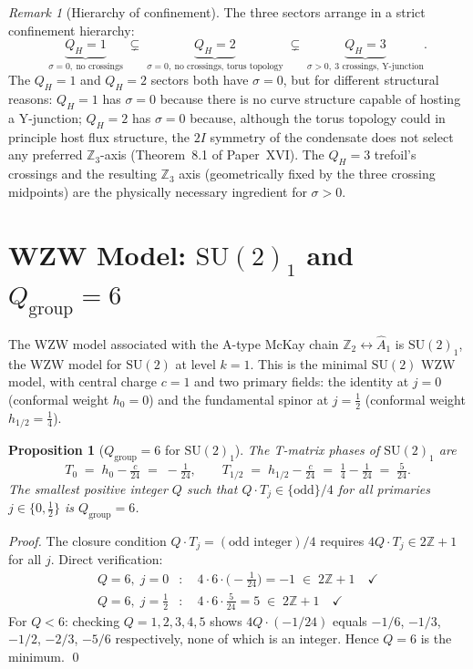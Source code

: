 \documentclass[11pt,a4paper]{article}
\newtheorem{proposition}[theorem]{Proposition}
\theoremstyle{definition}\newtheorem{definition}[theorem]{Definition}
\theoremstyle{remark}
\newtheorem{remark}[theorem]{Remark}
\newcommand{\SU}{\mathrm{SU}}
\newcommand{\twoI}{2I}
\newcommand{\QH}{Q_H}
\newcommand{\Ztwo}{\mathbb{Z}_2}
\newcommand{\Zthree}{\mathbb{Z}_3}
\begin{document}
\begin{remark}[Hierarchy of confinement]
\label{P17:rem:confinement_hierarchy}
The three sectors arrange in a strict confinement hierarchy:
\[
  \underbrace{\QH=1}_{\sigma=0,\ \text{no crossings}}
  \;\subsetneq\;
  \underbrace{\QH=2}_{\sigma=0,\ \text{no crossings, torus topology}}
  \;\subsetneq\;
  \underbrace{\QH=3}_{\sigma>0,\ \text{3 crossings, Y-junction}}.
\]
The $\QH=1$ and $\QH=2$ sectors both have $\sigma=0$, but for
different structural reasons: $\QH=1$ has $\sigma=0$ because there is
no curve structure capable of hosting a Y-junction; $\QH=2$ has
$\sigma=0$ because, although the torus topology could in principle host
flux structure, the $\twoI$ symmetry of the condensate does not select
any preferred $\Zthree$-axis (Theorem~8.1 %
of Paper~XVI). The $\QH=3$ trefoil's crossings and the resulting
$\Zthree$ axis (geometrically fixed by the three crossing midpoints)
are the physically necessary ingredient for $\sigma>0$.
\end{remark}

\section{WZW Model: $\SU(2)_1$ and $Q_{\mathrm{group}}=6$}
\label{P17:sec:wzw}

The WZW model associated with the A-type McKay chain
$\Ztwo\leftrightarrow\widehat{A}_1$ is $\SU(2)_1$, the WZW model for
$\SU(2)$ at level $k=1$. This is the minimal $\SU(2)$ WZW model,
with central charge $c=1$ and two primary fields: the identity at
$j=0$ (conformal weight $h_0=0$) and the fundamental spinor at
$j=\tfrac12$ (conformal weight $h_{1/2}=\tfrac14$).

\begin{proposition}[$Q_{\mathrm{group}}=6$ for $\SU(2)_1$]
\label{P17:prop:qh1_Qgroup}
The T-matrix phases of $\SU(2)_1$ are
\[
  T_0 \;=\; h_0 - \tfrac{c}{24} \;=\; -\tfrac{1}{24},
  \qquad
  T_{1/2} \;=\; h_{1/2} - \tfrac{c}{24} \;=\; \tfrac{1}{4} - \tfrac{1}{24} \;=\; \tfrac{5}{24}.
\]
The smallest positive integer $Q$ such that $Q\cdot T_j\in\{\text{odd}\}/4$
for all primaries $j\in\{0,\tfrac12\}$ is $Q_{\mathrm{group}}=6$.
\end{proposition}

\begin{proof}
The closure condition $Q\cdot T_j = (\text{odd integer})/4$
requires $4Q\cdot T_j\in2\mathbb{Z}+1$ for all $j$. Direct
verification:
\begin{align*}
  Q=6,\;j=0&:\quad 4\cdot6\cdot\bigl(-\tfrac{1}{24}\bigr) = -1 \;\in\; 2\mathbb{Z}+1 \quad\checkmark\\
  Q=6,\;j=\tfrac12&:\quad 4\cdot6\cdot\tfrac{5}{24} = 5 \;\in\; 2\mathbb{Z}+1 \quad\checkmark
\end{align*}
For $Q<6$: checking $Q=1,2,3,4,5$ shows $4Q\cdot(-1/24)$ equals
$-1/6$, $-1/3$, $-1/2$, $-2/3$, $-5/6$ respectively, none of
which is an integer. Hence $Q=6$ is the minimum.
\qed
\end{proof}
\end{document}
